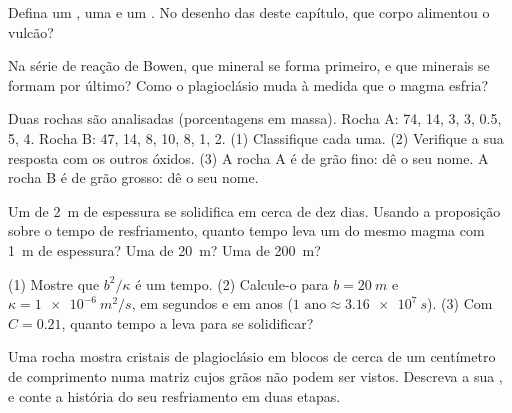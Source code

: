 \begin{exercise}[$\star$]\label{exo:g11:igneous-rocks:4}
Defina um , uma  e um . No desenho das  deste
capítulo, que corpo alimentou o vulcão?
\end{exercise}

\begin{exercise}[$\star$]\label{exo:g11:igneous-rocks:5}
Na série de reação de Bowen, que mineral se forma primeiro, e que minerais
se formam por último? Como o plagioclásio muda à medida que o magma esfria?
\end{exercise}

\begin{exercise}[$\star\star$]\label{exo:g11:igneous-rocks:6}
Duas rochas são analisadas (porcentagens em massa). Rocha A:  74,
 14,  3,  3,  0.5,  5,  4.
Rocha B:  47,  14,  8,  10,  8,
 1,  2. (1) Classifique cada uma. (2) Verifique a sua
resposta com os outros óxidos. (3) A rocha A é de grão fino: dê o seu nome.
A rocha B é de grão grosso: dê o seu nome.
\end{exercise}

\begin{exercise}[$\star\star$]\label{exo:g11:igneous-rocks:7}
Um  de \qty{2}{m} de espessura se solidifica em cerca de dez dias.
Usando a proposição sobre o tempo de resfriamento, quanto tempo leva um
 do mesmo magma com \qty{1}{m} de espessura? Uma  de
\qty{20}{m}? Uma de \qty{200}{m}?
\end{exercise}

\begin{exercise}[$\star\star$]\label{exo:g11:igneous-rocks:8}
(1) Mostre que $b^2/\kappa$ é um tempo. (2) Calcule-o para $b = \qty{20}{m}$
e $\kappa = \qty{1e-6}{m^2/s}$, em segundos e em anos
($\num{1}\text{ ano} \approx \qty{3.16e7}{s}$). (3) Com $C = 0.21$, quanto
tempo a  leva para se solidificar?
\end{exercise}

\begin{exercise}[$\star\star$]\label{exo:g11:igneous-rocks:9}
Uma rocha mostra cristais de plagioclásio em blocos de cerca de um
centímetro de comprimento numa matriz cujos grãos não podem ser vistos.
Descreva a sua , e conte a história do seu resfriamento em duas
etapas.
\end{exercise}


